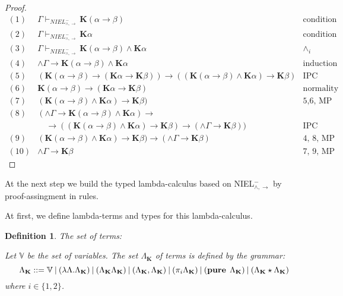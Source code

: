 \documentclass[a4paper]{article}
\newtheorem{defin}{Definition}
\begin{document}
\begin{proof}
$\begin{array}{lll}
(1)& \Gamma \vdash_{NIEL^{-}_{\land, \to}} \textbf{K}(\alpha \to \beta) & \text{condition}\\
(2)& \Gamma \vdash_{NIEL^{-}_{\land, \to}} \textbf{K}\alpha & \text{condition}\\
(3)& \Gamma \vdash_{NIEL^{-}_{\land, \to}} \textbf{K}(\alpha \to \beta) \land \textbf{K}\alpha & \land_i \\
(4)& \wedge \Gamma \rightarrow \textbf{K}(\alpha \to \beta) \land \textbf{K}\alpha & \text{induction
hypothesis} \\
(5)& (\textbf{K}(\alpha \rightarrow \beta) \rightarrow (\textbf{K}\alpha \to \textbf{K}\beta)) \rightarrow
((\textbf{K}(\alpha \rightarrow \beta) \land \textbf{K}\alpha) \rightarrow \textbf{K}\beta)& \text{IPC
theorem} \\
(6)&\textbf{K}(\alpha \rightarrow \beta) \rightarrow (\textbf{K}\alpha \to \textbf{K}\beta)&
\text{normality}\\
(7)&(\textbf{K}(\alpha \rightarrow \beta) \land \textbf{K}\alpha) \rightarrow \textbf{K}\beta)& \text{5,6,
MP}\\
(8)&(\wedge \Gamma \rightarrow \textbf{K}(\alpha \to \beta) \land \textbf{K}\alpha) \rightarrow & \\
&\quad\rightarrow ((\textbf{K}(\alpha \rightarrow \beta) \land \textbf{K}\alpha) \rightarrow
\textbf{K}\beta) \rightarrow
(\wedge \Gamma \rightarrow \textbf{K}\beta))& \text{IPC theorem} \\
(9) &(\textbf{K}(\alpha \rightarrow \beta) \land \textbf{K}\alpha) \rightarrow \textbf{K}\beta) \rightarrow
(\wedge \Gamma \rightarrow \textbf{K}\beta)& \text{4, 8, MP} \\
(10) &\wedge \Gamma \rightarrow \textbf{K}\beta& \text{7, 9, MP}
\end{array}$

  \end{proof}

  \vspace{\baselineskip}

  At the next step we build the typed lambda-calculus based on NIEL$^{-}_{\land, \to}$ by proof-assingment in
  rules.

  At first, we define lambda-terms and types for this lambda-calculus.

  \vspace{\baselineskip}

  \begin{defin} The set of terms:

  Let $\mathbb{V}$ be the set of variables. The set $\Lambda_{\textbf{K}}$ of terms is defined by the grammar:
  \begin{equation}
    \Lambda_{\textbf{K}} ::= \mathbb{V} \: | \:  (\lambda \Lambda.\Lambda_{\textbf{K}}) \: | \:
    (\Lambda_{\textbf{K}}\Lambda_{\textbf{K}}) \: | \: (\Lambda_{\textbf{K}} , \Lambda_{\textbf{K}}) \: | \:
    (\pi_i \Lambda_{\textbf{K}}) \:
    | \: ({\bf pure \: } \: \Lambda_{\textbf{K}}) \: | \: (\Lambda_{\textbf{K}} \star
    \Lambda_{\textbf{K}})
  \end{equation}
  where $i \in \{ 1, 2 \}$.
  \end{defin}
\end{document}
